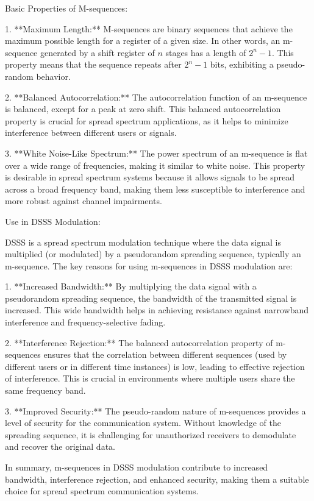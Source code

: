 \documentclass[colorlinks,11pt,a4paper,normalphoto,withhyper,ragged2e]{altareport}
\begin{document}
				Basic Properties of M-sequences:
				
				1. **Maximum Length:**
				M-sequences are binary sequences that achieve the maximum possible length for a register of a given size. In other words, an m-sequence generated by a shift register of \(n\) stages has a length of \(2^n - 1\). This property means that the sequence repeats after \(2^n - 1\) bits, exhibiting a pseudo-random behavior.
				
				2. **Balanced Autocorrelation:**
				The autocorrelation function of an m-sequence is balanced, except for a peak at zero shift. This balanced autocorrelation property is crucial for spread spectrum applications, as it helps to minimize interference between different users or signals.
				
				3. **White Noise-Like Spectrum:**
				The power spectrum of an m-sequence is flat over a wide range of frequencies, making it similar to white noise. This property is desirable in spread spectrum systems because it allows signals to be spread across a broad frequency band, making them less susceptible to interference and more robust against channel impairments.
				
				Use in DSSS Modulation:
				
				DSSS is a spread spectrum modulation technique where the data signal is multiplied (or modulated) by a pseudorandom spreading sequence, typically an m-sequence. The key reasons for using m-sequences in DSSS modulation are:
				
				1. **Increased Bandwidth:**
				By multiplying the data signal with a pseudorandom spreading sequence, the bandwidth of the transmitted signal is increased. This wide bandwidth helps in achieving resistance against narrowband interference and frequency-selective fading.
				
				2. **Interference Rejection:**
				The balanced autocorrelation property of m-sequences ensures that the correlation between different sequences (used by different users or in different time instances) is low, leading to effective rejection of interference. This is crucial in environments where multiple users share the same frequency band.
				
				3. **Improved Security:**
				The pseudo-random nature of m-sequences provides a level of security for the communication system. Without knowledge of the spreading sequence, it is challenging for unauthorized receivers to demodulate and recover the original data.
				
				In summary, m-sequences in DSSS modulation contribute to increased bandwidth, interference rejection, and enhanced security, making them a suitable choice for spread spectrum communication systems.
				
\end{document}

